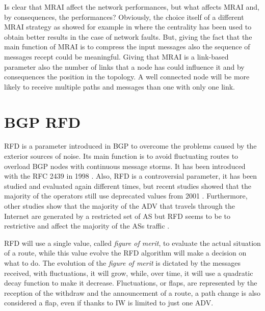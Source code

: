 Is clear that \ac{MRAI} affect the network performances, but what affects \ac{MRAI}
and, by consequences, the performances?
Obviously, the choice itself of a different \ac{MRAI} strategy as showed for 
example in \cite{milani2019BGP} where the centrality has been used to obtain better
results in the case of network faults.
But, giving the fact that the main function of \ac{MRAI} is to compress the 
input messages also the sequence of messages recept could be meaningful.
Giving that \ac{MRAI} is a link-based parameter also the number of links that
a node has could influence it and by consequences the position in the topology.
A well connected node will be more likely to receive multiple paths and messages
than one with only one link.


\section{BGP RFD}
\label{sec:bgp_rfd}

\ac{RFD} is a parameter introduced in \ac{BGP} to overcome the problems caused
by the exterior sources of noise.
Its main function is to avoid fluctuating routes to overload \ac{BGP} nodes 
with continuous message storms.
It has been introduced with the \ac{RFC} \num{2439} in \num{1998} \cite{rfc2439}.
Also, \ac{RFD} is a controversial parameter, it has been studied and evaluated again
different times, but recent studies showed that the majority of the operators 
still use deprecated values from \num{2001} \cite{gray2020bgp}.
Furthermore, other studies show that the majority of the \ac{ADV} that travels
through the Internet are generated by a restricted set of \ac{AS} but \ac{RFD}
seems to be to restrictive and affect the majority of the \acp{AS} traffic
\cite{pelsser2011route}.

\ac{RFD} will use a single value, called \textit{figure of merit}, to evaluate
the actual situation of a route, while this value evolve the \ac{RFD} algorithm
will make a decision on what to do.
The evolution of the \textit{figure of merit} is dictated by the messages received,
with fluctuations, it will grow, while, over time, it will use a quadratic decay
function to make it decrease.
Fluctuations, or flaps, are represented by the reception of the withdraw and
the announcement of a route, a path change is also considered a flap, even
if thanks to \ac{IW} is limited to just one \ac{ADV}.

